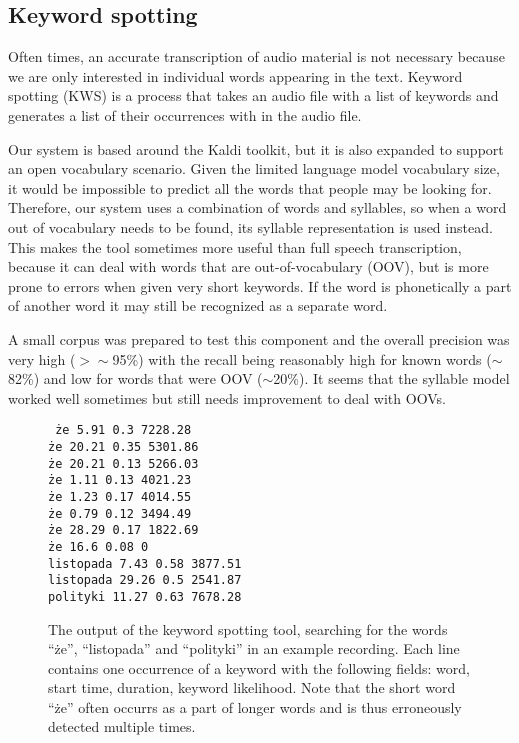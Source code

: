 \documentclass[a4paper,11pt]{article}
\begin{document}
\subsection{Keyword spotting}

Often times, an accurate transcription of audio material is not necessary because we are only interested in individual words appearing in the text. Keyword spotting (KWS) is a process that takes an audio file with a list of keywords and generates a list of their occurrences with in the audio file.

Our system is based around the Kaldi toolkit, but it is also expanded to support an open vocabulary scenario. Given the limited language model vocabulary size, it would be impossible to predict all the words that people may be looking for. Therefore, our system uses a combination of words and syllables, so when a word out of vocabulary needs to be found, its syllable representation is used instead. This makes the tool sometimes more useful than full speech transcription, because it can deal with words that are out-of-vocabulary (OOV), but is more prone to errors when given very short keywords. If the word is phonetically a part of another word it may still be recognized as a separate word.

A small corpus was prepared to test this component and the overall precision was very high ($>\sim$95\%) with the recall being reasonably high for known words ($\sim$82\%) and low for words that were OOV ($\sim$20\%). It seems that the syllable model worked well sometimes but still needs improvement to deal with OOVs.


\begin{figure}
    \centering
\texttt{
\.ze 5.91 0.3 7228.28\\
\.ze 20.21 0.35 5301.86\\
\.ze 20.21 0.13 5266.03\\
\.ze 1.11 0.13 4021.23\\
\.ze 1.23 0.17 4014.55\\
\.ze 0.79 0.12 3494.49\\
\.ze 28.29 0.17 1822.69\\
\.ze 16.6 0.08 0\\
listopada 7.43 0.58 3877.51\\
listopada 29.26 0.5 2541.87\\
polityki 11.27 0.63 7678.28\\
}
    \caption{The output of the keyword spotting tool, searching for the words ``\.ze'', ``listopada'' and ``polityki'' in an example recording. Each line contains one occurrence of a keyword with the following fields: word, start time, duration, keyword likelihood. Note that the short word ``\.ze'' often occurrs as a part of longer words and is thus erroneously detected multiple times.}
\end{figure}
\end{document}
